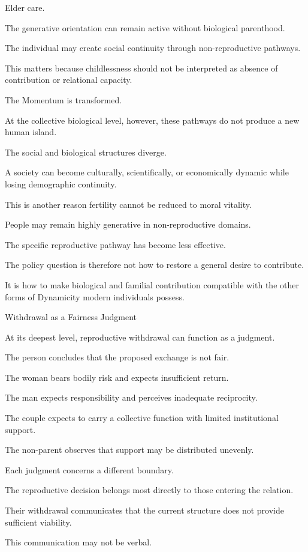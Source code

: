 Elder care.

The generative orientation can remain active without biological parenthood.

The individual may create social continuity through non-reproductive pathways.

This matters because childlessness should not be interpreted as absence of contribution or relational capacity.

The Momentum is transformed.

At the collective biological level, however, these pathways do not produce a new human island.

The social and biological structures diverge.

A society can become culturally, scientifically, or economically dynamic while losing demographic continuity.

This is another reason fertility cannot be reduced to moral vitality.

People may remain highly generative in non-reproductive domains.

The specific reproductive pathway has become less effective.

The policy question is therefore not how to restore a general desire to contribute.

It is how to make biological and familial contribution compatible with the other forms of Dynamicity modern individuals possess.

Withdrawal as a Fairness Judgment

At its deepest level, reproductive withdrawal can function as a judgment.

The person concludes that the proposed exchange is not fair.

The woman bears bodily risk and expects insufficient return.

The man expects responsibility and perceives inadequate reciprocity.

The couple expects to carry a collective function with limited institutional support.

The non-parent observes that support may be distributed unevenly.

Each judgment concerns a different boundary.

The reproductive decision belongs most directly to those entering the relation.

Their withdrawal communicates that the current structure does not provide sufficient viability.

This communication may not be verbal.

